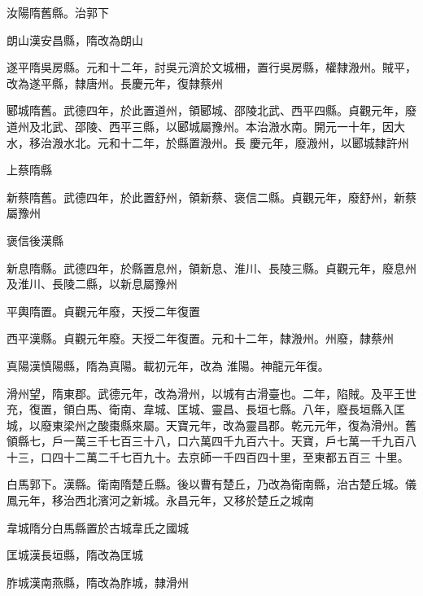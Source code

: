 \begin{pinyinscope}
 汝陽隋舊縣。治郭下



 朗山漢安昌縣，隋改為朗山



 遂平隋吳房縣。元和十二年，討吳元濟於文城柵，置行吳房縣，權隸溵州。賊平，改為遂平縣，隸唐州。長慶元年，復隸蔡州



 郾城隋舊。武德四年，於此置道州，領郾城、邵陵北武、西平四縣。貞觀元年，廢道州及北武、邵陵、西平三縣，以郾城屬豫州。本治溵水南。開元一十年，因大水，移治溵水北。元和十二年，於縣置溵州。長
 慶元年，廢溵州，以郾城隸許州



 上蔡隋縣



 新蔡隋舊。武德四年，於此置舒州，領新蔡、褒信二縣。貞觀元年，廢舒州，新蔡屬豫州



 褒信後漢縣



 新息隋縣。武德四年，於縣置息州，領新息、淮川、長陵三縣。貞觀元年，廢息州及淮川、長陵二縣，以新息屬豫州



 平輿隋置。貞觀元年廢，天授二年復置



 西平漢縣。貞觀元年廢。天授二年復置。元和十二年，隸溵州。州廢，隸蔡州



 真陽漢慎陽縣，隋為真陽。載初元年，改為
 淮陽。神龍元年復。



 滑州望，隋東郡。武德元年，改為滑州，以城有古滑臺也。二年，陷賊。及平王世充，復置，領白馬、衛南、韋城、匡城、靈昌、長垣七縣。八年，廢長垣縣入匡城，以廢東梁州之酸棗縣來屬。天寶元年，改為靈昌郡。乾元元年，復為滑州。舊領縣七，戶一萬三千七百三十八，口六萬四千九百六十。天寶，戶七萬一千九百八十三，口四十二萬二千七百九十。去京師一千四百四十里，至東都五百三
 十里。



 白馬郭下。漢縣。衛南隋楚丘縣。後以曹有楚丘，乃改為衛南縣，治古楚丘城。儀鳳元年，移治西北濱河之新城。永昌元年，又移於楚丘之城南



 韋城隋分白馬縣置於古城韋氏之國城



 匡城漢長垣縣，隋改為匡城



 胙城漢南燕縣，隋改為胙城，隸滑州




\end{pinyinscope}
